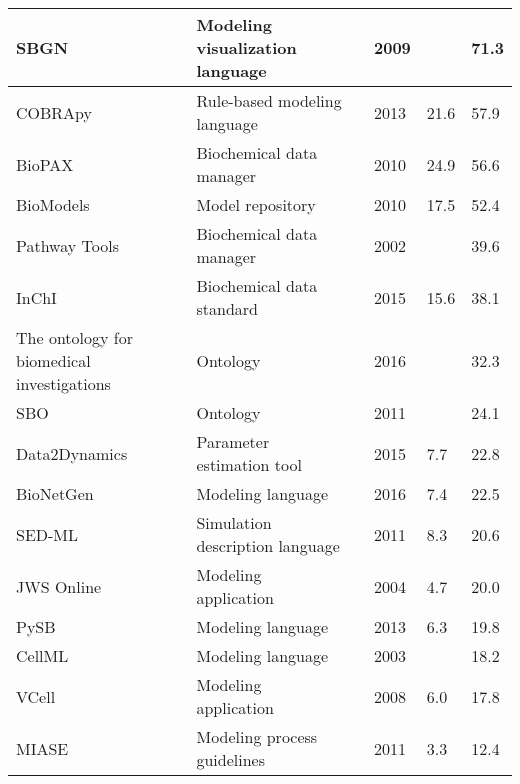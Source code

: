 \begin{longtable}{ |m{2.2cm}|m{5cm}|m{1.2cm}|m{1cm}|m{1.2cm}|m{1cm}| }
\hline
\small{SBGN} &\small{Modeling visualization language} &\cite{Novere2009TheNotation} &\small{2009} &\small{} &\small{71.3}\\
\hline
\small{COBRApy} &\small{Rule-based modeling language} &\cite{ebrahim2013cobrapy} &\small{2013} &\small{21.6} &\small{57.9}\\
\hline
\small{BioPAX} &\small{Biochemical data manager} &\cite{Demir2010TheSharing.} &\small{2010} &\small{24.9} &\small{56.6}\\
\hline
\small{BioModels} &\small{Model repository} &\cite{Li2010BioModelsModelsb} &\small{2010} &\small{17.5} &\small{52.4}\\
\hline
\small{Pathway Tools} &\small{Biochemical data manager} &\cite{karp2002pathway} &\small{2002} &\small{} &\small{39.6}\\
\hline
\small{InChI} &\small{Biochemical data standard} &\cite{Heller2015InChIIdentifier.} &\small{2015} &\small{15.6} &\small{38.1}\\
\hline
\small{The ontology for biomedical investigations} &\small{Ontology} &\cite{Bandrowski2016TheInvestigations} &\small{2016} &\small{} &\small{32.3}\\
\hline
\small{SBO} &\small{Ontology} &\cite{Courtot2011ControlledBiology.} &\small{2011} &\small{} &\small{24.1}\\
\hline
\small{Data2Dynamics} &\small{Parameter estimation tool} &\cite{Raue2015Data2Dynamics:Systems} &\small{2015} &\small{7.7} &\small{22.8}\\
\hline
\small{BioNetGen} &\small{Modeling language} &\cite{Harris2016BioNetGenModeling} &\small{2016} &\small{7.4} &\small{22.5}\\
\hline
\small{SED-ML} &\small{Simulation description language} &\cite{Waltemath2011ReproducibleLanguage} &\small{2011} &\small{8.3} &\small{20.6}\\
\hline
\small{JWS Online} &\small{Modeling application} &\cite{Olivier2004Web-basedOnline} &\small{2004} &\small{4.7} &\small{20.0}\\
\hline
\small{PySB} &\small{Modeling language} &\cite{Lopez2013ProgrammingPySB} &\small{2013} &\small{6.3} &\small{19.8}\\
\hline
\small{CellML} &\small{Modeling language} &\cite{Cuellar2003AnLanguage} &\small{2003} &\small{} &\small{18.2}\\
\hline
\small{VCell} &\small{Modeling application} &\cite{moraru2008virtual} &\small{2008} &\small{6.0} &\small{17.8}\\
\hline
\small{MIASE} &\small{Modeling process guidelines} &\cite{Waltemath2011MinimumMIASE} &\small{2011} &\small{3.3} &\small{12.4}\\

\end{longtable}
